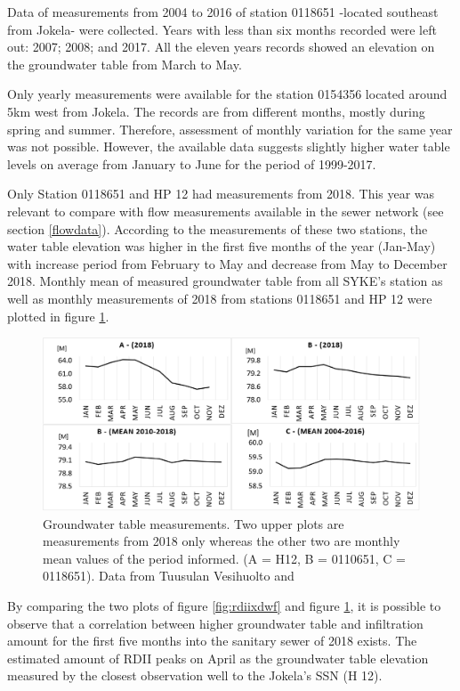 Data of measurements from 2004 to 2016 of station 0118651 -located southeast from Jokela- were collected. Years with less than six months recorded were left out: 2007; 2008; and 2017. All the eleven years records showed an elevation on the groundwater table from March to May.

Only yearly measurements were available for the station 0154356 located around 5km west from Jokela. The records are from different months, mostly during spring and summer. Therefore, assessment of monthly variation for the same year was not possible. However, the available data suggests slightly higher water table levels on average from January to June for the period of 1999-2017.

Only Station 0118651 and HP 12 had measurements from 2018. This year was relevant to compare with flow measurements available in the sewer network (see section \ref{flowdata}). According to the measurements of these two stations, the water table elevation was higher in the first five months of the year (Jan-May) with increase period from February to May and decrease from May to December 2018.
Monthly mean of measured groundwater table from all SYKE's station as well as monthly measurements of 2018 from stations 0118651 and HP 12 were plotted in figure \ref{fig:gwmeasurements}.

\begin{figure}[h]
    \centering
	\includegraphics[scale=0.6]{figures/gwmeasurements.png}
	\caption{Groundwater table measurements. Two upper plots are measurements from 2018 only whereas the other two are monthly mean values of the period informed.  (A = H12, B = 0110651, C = 0118651). Data from Tuusulan Vesihuolto and \citet{sykedata}}
	\label{fig:gwmeasurements}
\end{figure}

 
By comparing the two plots of figure \ref{fig:rdiixdwf} and figure \ref{fig:gwmeasurements}, it is possible to observe that a correlation between higher groundwater table and infiltration amount for the first five months into the sanitary sewer of 2018 exists. The estimated amount of RDII peaks on April as the groundwater table elevation measured by the closest observation well to the Jokela's \ac{SSN} (H 12).

